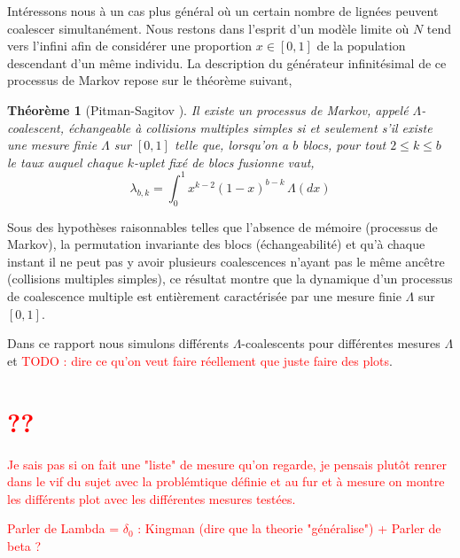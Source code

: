 \documentclass[12pt,a4paper]{article}
\newtheorem{theorem}{Théorème}
\begin{document}
Intéressons nous à un cas plus général
où un certain nombre de lignées peuvent coalescer simultanément.
Nous restons dans l'esprit d'un modèle limite où $N$ tend vers l'infini
afin de considérer une proportion $x \in [0,1]$ de la population descendant d'un même individu. 
La description du générateur infinitésimal de ce processus
de Markov repose sur le théorème suivant,

\begin{theorem}[Pitman-Sagitov {\cite{Pitman1999,Sagitov1999}}]
Il existe un processus de Markov, appelé $\Lambda$-coalescent,
échangeable à collisions multiples simples si et seulement s'il
existe une mesure finie $\Lambda$ sur $[0,1]$ telle que, lorsqu'on a $b$ blocs,
pour tout $2\le k\le b$ le taux auquel chaque $k$-uplet fixé de blocs
fusionne vaut, 
\[
\lambda_{b,k}=\int_0^1 x^{k-2}(1-x)^{b-k}\,\Lambda(dx)
\]
\end{theorem}

Sous des hypothèses raisonnables telles 
que l'absence de mémoire (processus de Markov),
la permutation invariante des blocs (échangeabilité) et 
qu'à chaque instant il ne peut pas y avoir plusieurs coalescences 
n'ayant pas le même ancêtre (collisions multiples simples), 
ce résultat montre que la dynamique 
d'un processus de coalescence multiple est entièrement caractérisée
par une mesure finie $\Lambda$ sur $[0,1]$.

Dans ce rapport nous simulons différents $\Lambda$-coalescents
pour différentes mesures $\Lambda$
et \textcolor{red}{TODO : dire ce qu'on veut faire réellement que juste faire des plots}.


\section{\textcolor{red}{??}}
\textcolor{red}{Je sais pas si on fait une "liste" de mesure qu'on regarde,
je pensais plutôt renrer dans le vif du sujet avec la problémtique définie
et au fur et à mesure on montre les différents plot avec les différentes mesures 
testées.
}

\textcolor{red}{Parler de Lambda = $\delta_0$ : Kingman (dire que la theorie "généralise") + Parler de beta ?}
\end{document}
